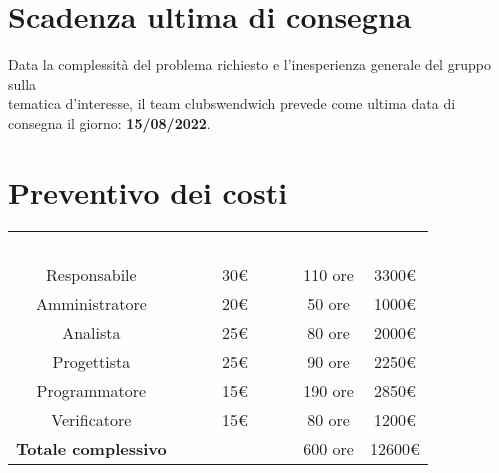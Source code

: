 \section{Scadenza ultima di consegna}
Data la complessità del problema richiesto e l'inesperienza generale del gruppo sulla \\
tematica d'interesse, il team clubswendwich prevede come ultima data di consegna 
il giorno: \textbf{15/08/2022}.

\section{Preventivo dei costi}
{\renewcommand{\arraystretch}{1.5}
\begin{tabular}{cccc}
	\rowcolor[RGB]{33, 73, 50}
	\textcolor{white}{\textbf{Ruolo}} & \textcolor{white}{\textbf{Costo Orario}} 
    & \textcolor{white}{\textbf{Ore}} & \textcolor{white}{\textbf{Totale}}\\
	\rowcolor[RGB]{216, 235, 171}
	Responsabile & 30€ & 110 ore & 3300€     			\\
	\rowcolor[RGB]{233, 245, 206}
	Amministratore & 20€ & 50 ore & 1000€    			\\
    \rowcolor[RGB]{216, 235, 171}
	Analista & 25€ & 80 ore & 2000€          			\\
	\rowcolor[RGB]{233, 245, 206}
	Progettista & 25€ & 90 ore & 2250€       			\\
    \rowcolor[RGB]{216, 235, 171}
	Programmatore & 15€ & 190 ore & 2850€     			\\
	\rowcolor[RGB]{233, 245, 206}
	Verificatore & 15€ & 80 ore & 1200€      			\\
	\rowcolor[RGB]{216, 235, 171}
	\textbf{Totale complessivo} & & 600 ore & 12600€    \\
\end{tabular}	
}

